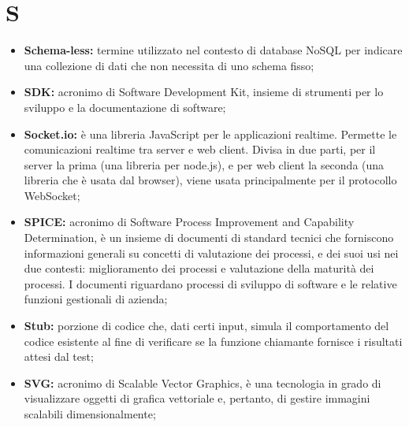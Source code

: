 \section*{\Huge S} %
\label{sec:s}
	\begin{itemize}
		\item \textbf{Schema-less:} termine utilizzato nel contesto di database NoSQL per indicare una collezione di dati che non necessita di uno schema fisso;
		\item \textbf{SDK:} acronimo di Software Development Kit, insieme di strumenti per lo sviluppo e la documentazione di software;	
		\item \textbf{Socket.io:} è una libreria JavaScript per le applicazioni realtime. Permette le comunicazioni realtime tra server e web client. Divisa in due parti, per il server la prima (una libreria per node.js), e per web client la seconda (una libreria che è usata dal browser), viene usata principalmente per il protocollo WebSocket;
		\item \textbf{SPICE:} acronimo di Software Process Improvement and Capability Determination, è un insieme di documenti di standard tecnici che forniscono informazioni generali su concetti di valutazione dei processi, e dei suoi usi nei due contesti: miglioramento dei processi e valutazione della maturità dei processi. I documenti riguardano processi di sviluppo di software e le relative funzioni gestionali di azienda;
		\item \textbf{Stub:} porzione di codice che, dati certi input, simula il comportamento del codice esistente al fine di verificare se la funzione chiamante fornisce i risultati attesi dal test;	
		\item \textbf{SVG:} acronimo di Scalable Vector Graphics, è una tecnologia in grado di visualizzare oggetti di grafica vettoriale e, pertanto, di gestire immagini scalabili dimensionalmente;
	\end{itemize}
\pagebreak

